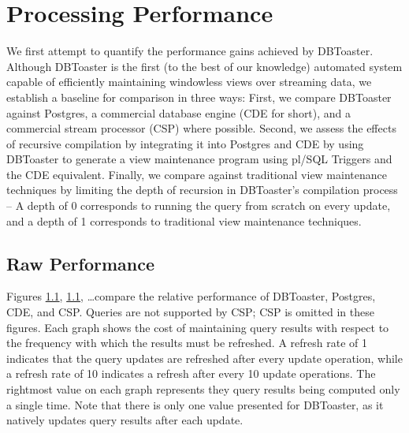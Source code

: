 \section{Processing Performance}
We first attempt to quantify the performance gains achieved by DBToaster.  Although DBToaster is the first (to the best of our knowledge) automated system capable of efficiently maintaining windowless views over streaming data, we establish a baseline for comparison in three ways: First, we compare DBToaster against Postgres, a commercial database engine (CDE for short), and a commercial stream processor (CSP) where possible.  Second, we assess the effects of recursive compilation by integrating it into Postgres and CDE by using DBToaster to generate a view maintenance program using pl/SQL Triggers and the CDE equivalent.  Finally, we compare against traditional view maintenance techniques by limiting the depth of recursion in DBToaster's compilation process -- A depth of 0 corresponds to running the query from scratch on every update, and a depth of 1 corresponds to traditional view maintenance techniques.  

\subsection{Raw Performance}
Figures \ref{}, \ref{}, \ldots compare the relative performance of DBToaster, Postgres, CDE, and CSP.  Queries  are not supported by CSP; CSP is omitted in these figures.  Each graph shows the cost of maintaining query results with respect to the frequency with which the results must be refreshed.  A refresh rate of 1 indicates that the query updates are refreshed after every update operation, while a refresh rate of 10 indicates a refresh after every 10 update operations.  The rightmost value on each graph represents they query results being computed only a single time.  Note that there is only one value presented for DBToaster, as it natively updates query results after each update.


